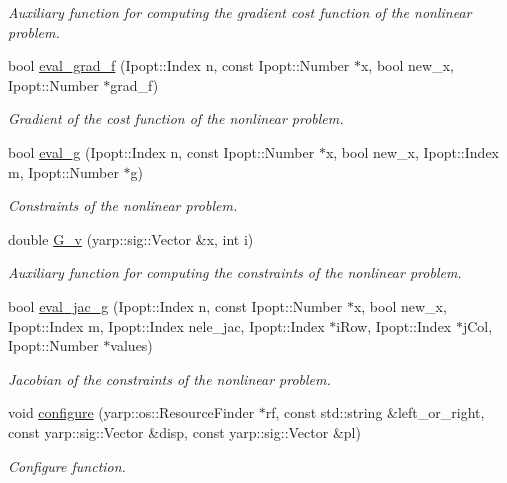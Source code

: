 \begin{DoxyCompactItemize}
\begin{DoxyCompactList}\small\item\em Auxiliary function for computing the gradient cost function of the nonlinear problem. \end{DoxyCompactList}\item 
bool \hyperlink{classgrasping__NLP_a91be45219cf7e32daa8934dd59295ba0}{eval\+\_\+grad\+\_\+f} (Ipopt\+::\+Index n, const Ipopt\+::\+Number $\ast$x, bool new\+\_\+x, Ipopt\+::\+Number $\ast$grad\+\_\+f)
\begin{DoxyCompactList}\small\item\em Gradient of the cost function of the nonlinear problem. \end{DoxyCompactList}\item 
bool \hyperlink{classgrasping__NLP_a5d2066df7d89a47af9d5b79940fe10ff}{eval\+\_\+g} (Ipopt\+::\+Index n, const Ipopt\+::\+Number $\ast$x, bool new\+\_\+x, Ipopt\+::\+Index m, Ipopt\+::\+Number $\ast$g)
\begin{DoxyCompactList}\small\item\em Constraints of the nonlinear problem. \end{DoxyCompactList}\item 
double \hyperlink{classgrasping__NLP_acc0ace418469386b16adb2c70a98c14d}{G\+\_\+v} (yarp\+::sig\+::\+Vector \&x, int i)
\begin{DoxyCompactList}\small\item\em Auxiliary function for computing the constraints of the nonlinear problem. \end{DoxyCompactList}\item 
bool \hyperlink{classgrasping__NLP_ab0e4e5721c5f018331ffe840022fb504}{eval\+\_\+jac\+\_\+g} (Ipopt\+::\+Index n, const Ipopt\+::\+Number $\ast$x, bool new\+\_\+x, Ipopt\+::\+Index m, Ipopt\+::\+Index nele\+\_\+jac, Ipopt\+::\+Index $\ast$i\+Row, Ipopt\+::\+Index $\ast$j\+Col, Ipopt\+::\+Number $\ast$values)
\begin{DoxyCompactList}\small\item\em Jacobian of the constraints of the nonlinear problem. \end{DoxyCompactList}\item 
void \hyperlink{classgrasping__NLP_ab776f3ee1299d3927aa62b50f1bb3d3e}{configure} (yarp\+::os\+::\+Resource\+Finder $\ast$rf, const std\+::string \&left\+\_\+or\+\_\+right, const yarp\+::sig\+::\+Vector \&disp, const yarp\+::sig\+::\+Vector \&pl)
\begin{DoxyCompactList}\small\item\em Configure function. \end{DoxyCompactList}\item 

\end{DoxyCompactItemize}
